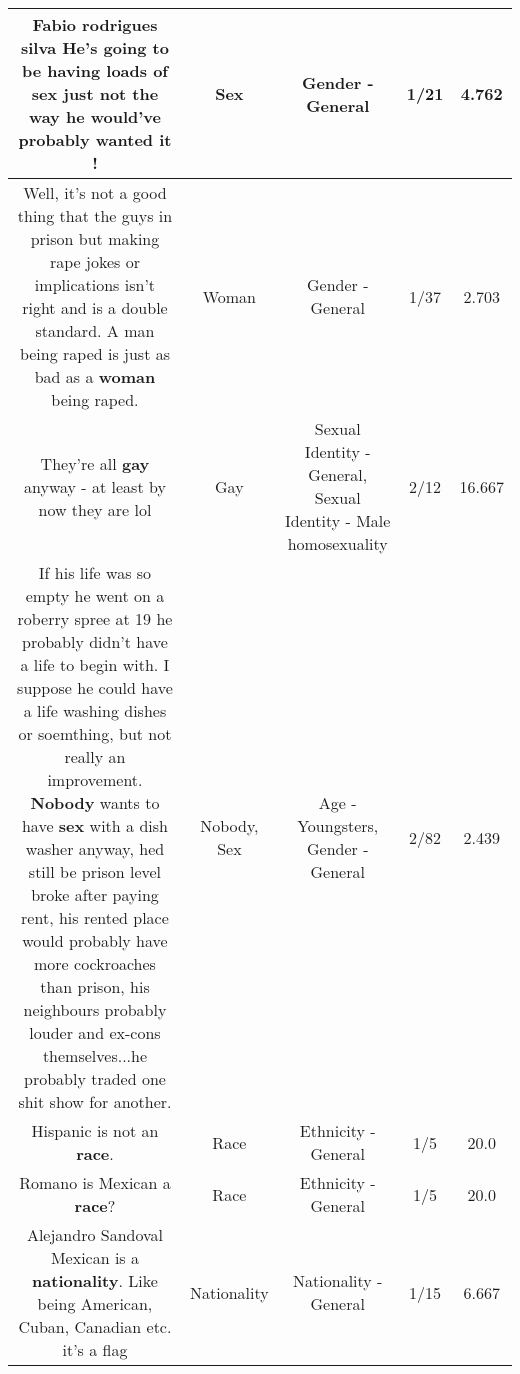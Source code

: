 \documentclass[11pt]{article}
\newlength\mylength
\begin{document}
\begin{center}
\begin{longtable}{|C{.65\mylength}|C{.30\mylength}|C{.12\mylength}|C{.12\mylength}|C{.12\mylength}|}
  \small Fabio rodrigues silva He's going to be having loads of \textbf{sex} just not the way he would've probably wanted it !\normalsize   & Sex & Gender - General & 1/21 & 4.762 \\  \hline
  \small Well, it's not a good thing that the guys in prison but making rape jokes or implications isn't right and is a double standard. A man being raped is just as bad as a \textbf{woman} being raped.\normalsize   & Woman & Gender - General & 1/37 & 2.703 \\  \hline
  \small They're all \textbf{g\textbf{ay}} anyway - at least by now they are lol\normalsize   & Gay & Sexual Identity - General, Sexual Identity - Male homosexuality & 2/12 & 16.667 \\  \hline
  \small If his life was so empty he went on a roberry spree at 19 he probably didn't have a life to begin with. I suppose he could have a life washing dishes or soemthing, but not really an improvement. \textbf{Nobody} wants to have \textbf{sex} with a dish washer anyway, hed still be prison level broke after paying rent, his rented place would probably have more cockroaches than prison, his neighbours probably louder and ex-cons themselves...he probably traded one shit show for another.\normalsize   & Nobody, Sex & Age - Youngsters, Gender - General & 2/82 & 2.439 \\  \hline
  \small Hispanic is not an \textbf{race}.\normalsize   & Race & Ethnicity - General & 1/5 & 20.0 \\  \hline
  \small Romano is Mexican a \textbf{race}?\normalsize   & Race & Ethnicity - General & 1/5 & 20.0 \\  \hline
  \small Alejandro Sandoval Mexican is a \textbf{nationality}. Like being American, Cuban, Canadian etc. it's a flag\normalsize   & Nationality & Nationality - General & 1/15 & 6.667 \\  \hline

\end{longtable}
\end{center}
\end{document}

